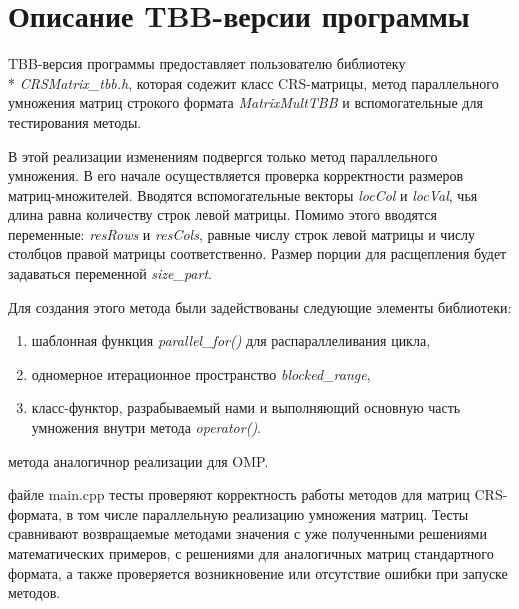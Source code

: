 \documentclass[14pt, russian]{extarticle}
\begin{document}
	\section{Описание TBB-версии программы}

    \indent TBB-версия программы предоставляет пользователю библиотеку\\* 
    \emph{CRSMatrix\_tbb.h}, которая содежит класс CRS-матрицы, метод параллельного умножения матриц строкого формата \emph{MatrixMultTBB} и вспомогательные для тестирования методы. 

    \indent В этой реализации изменениям подвергся только метод параллельного умножения. В его начале осуществляется проверка корректности размеров матриц-множителей. Вводятся вспомогательные векторы \emph{locCol} и \emph{locVal}, чья длина равна количеству строк левой матрицы. Помимо этого вводятся переменные: \emph{resRows} и \emph{resCols}, равные числу строк левой матрицы и числу столбцов правой матрицы соответственно. Размер порции для расщепления будет задаваться переменной \emph{size\_part}.

    \indent Для создания этого метода были задействованы следующие элементы библиотеки:
     \begin{enumerate}[topsep=0pt, labelwidth=!, labelindent=0pt]
		\item шаблонная функция \emph{parallel\_for()} для распараллеливания цикла,
		\item одномерное итерационное пространство \emph{blocked\_range},
        \item класс-функтор, разрабываемый нами и выполняющий основную часть умножения внутри метода 
\emph{operator()}.
	\end{enumerate}

      метода аналогичнор реализации для OMP.

     файле main.cpp  тесты проверяют корректность работы методов для матриц CRS-формата, в том числе параллельную реализацию умножения матриц. Тесты сравнивают возвращаемые методами значения с уже полученными решениями математических примеров, с решениями для аналогичных матриц стандартного формата, а также проверяется возникновение или отсутствие ошибки при запуске методов.

	\newpage
\end{document}
